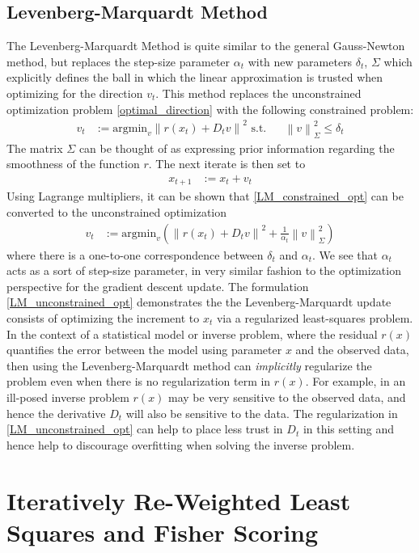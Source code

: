 \documentclass[12pt]{article}
\newcommand*{\norm}[1]{\left\lVert#1\right\rVert}
\begin{document}
\subsection{Levenberg-Marquardt Method}
The Levenberg-Marquardt Method is quite similar to the general Gauss-Newton method, but replaces the step-size parameter $\alpha_t$ with new parameters $\delta_t$, $\Sigma$ which explicitly defines 
the ball in which the linear approximation is trusted when optimizing for the direction $v_t$. This method replaces the unconstrained optimization problem \ref{optimal_direction} with the following 
constrained problem:
\begin{align}
v_t &:= \text{argmin}_v \norm{r(x_t) + D_t v}^2 \text{   s.t.} && \norm{v}^2_{\Sigma} \leq \delta_t \label{LM_constrained_opt}
\end{align}
The matrix $\Sigma$ can be thought of as expressing prior information regarding the smoothness of the function $r$. The next iterate is then set to 
\begin{align*}
x_{t+1} &:= x_t + v_t
\end{align*}
Using Lagrange multipliers, it can be shown that \ref{LM_constrained_opt} can be converted to the unconstrained optimization 
\begin{align}
v_t &:= \text{argmin}_v\left( \norm{r(x_t) + D_t v}^2 + \frac{1}{\alpha_t} \norm{v}^2_{\Sigma}\right) \label{LM_unconstrained_opt}
\end{align}
where there is a one-to-one correspondence between $\delta_t$ and $\alpha_t$. We see that $\alpha_t$ acts as a sort of step-size parameter, in very similar fashion to the optimization perspective 
for the gradient descent update. The formulation \ref{LM_unconstrained_opt} demonstrates the the Levenberg-Marquardt update consists of optimizing the increment to $x_t$ via a regularized 
least-squares problem. In the context of a statistical model or inverse problem, where the residual $r(x)$ quantifies the error between the model using parameter $x$ and the observed data, then 
using the Levenberg-Marquardt method can \textit{implicitly} regularize the problem even when there is no regularization term in $r(x)$. For example, in an ill-posed inverse problem $r(x)$ may be very 
sensitive to the observed data, and hence the derivative $D_t$ will also be sensitive to the data. The regularization in \ref{LM_unconstrained_opt} can help to place less trust in $D_t$ in this setting and hence 
help to discourage overfitting when solving the inverse problem.  


\section{Iteratively Re-Weighted Least Squares and Fisher Scoring}
\end{document}
